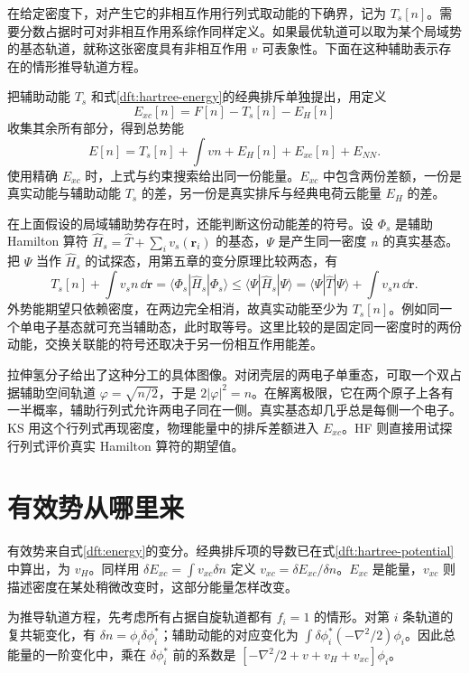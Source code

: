 在给定密度下，对产生它的非相互作用行列式取动能的下确界，记为 $T_s[n]$。需要分数占据时可对非相互作用系综作同样定义。如果最优轨道可以取为某个局域势的基态轨道，就称这张密度具有非相互作用 $v$ 可表象性。下面在这种辅助表示存在的情形推导轨道方程。

把辅助动能 $T_s$ 和式\eqref{dft:hartree-energy}的经典排斥单独提出，用定义
\begin{equation}\label{dft:xc-definition}
E_{xc}[n]=F[n]-T_s[n]-E_H[n]
\end{equation}
收集其余所有部分，得到总势能
\begin{equation}\label{dft:energy}
E[n]=T_s[n]+\int vn+E_H[n]+E_{xc}[n]+E_{NN}.
\end{equation}
使用精确 $E_{xc}$ 时，上式与约束搜索给出同一份能量。$E_{xc}$ 中包含两份差额，一份是真实动能与辅助动能 $T_s$ 的差，另一份是真实排斥与经典电荷云能量 $E_H$ 的差。

在上面假设的局域辅助势存在时，还能判断这份动能差的符号。设 $\Phi_s$ 是辅助 Hamilton 算符 $\hat H_s=\hat T+\sum_i v_s(\bm r_i)$ 的基态，$\Psi$ 是产生同一密度 $n$ 的真实基态。把 $\Psi$ 当作 $\hat H_s$ 的试探态，用第五章的变分原理比较两态，有
\[
 T_s[n]+\int v_s n\,\dd\bm r
 =\langle\Phi_s|\hat H_s|\Phi_s\rangle
 \le \langle\Psi|\hat H_s|\Psi\rangle
 =\langle\Psi|\hat T|\Psi\rangle+\int v_s n\,\dd\bm r .
\]
外势能期望只依赖密度，在两边完全相消，故真实动能至少为 $T_s[n]$。例如同一个单电子基态就可充当辅助态，此时取等号。这里比较的是固定同一密度时的两份动能，交换关联能的符号还取决于另一份相互作用能差。

拉伸氢分子给出了这种分工的具体图像。对闭壳层的两电子单重态，可取一个双占据辅助空间轨道 $\varphi=\sqrt{n/2}$，于是 $2|\varphi|^2=n$。在解离极限，它在两个原子上各有一半概率，辅助行列式允许两电子同在一侧。真实基态却几乎总是每侧一个电子。KS 用这个行列式再现密度，物理能量中的排斥差额进入 $E_{xc}$。HF 则直接用试探行列式评价真实 Hamilton 算符的期望值。

\section{有效势从哪里来}
有效势来自式\eqref{dft:energy}的变分。经典排斥项的导数已在式\eqref{dft:hartree-potential}中算出，为 $v_H$。同样用 $\delta E_{xc}=\int v_{xc}\delta n$ 定义 $v_{xc}=\delta E_{xc}/\delta n$。$E_{xc}$ 是能量，$v_{xc}$ 则描述密度在某处稍微改变时，这部分能量怎样改变。

为推导轨道方程，先考虑所有占据自旋轨道都有 $f_i=1$ 的情形。对第 $i$ 条轨道的复共轭变化，有 $\delta n=\phi_i\delta\phi_i^*$；辅助动能的对应变化为 $\int\delta\phi_i^*(-\nabla^2/2)\phi_i$。因此总能量的一阶变化中，乘在 $\delta\phi_i^*$ 前的系数是 $[-\nabla^2/2+v+v_H+v_{xc}]\phi_i$。

